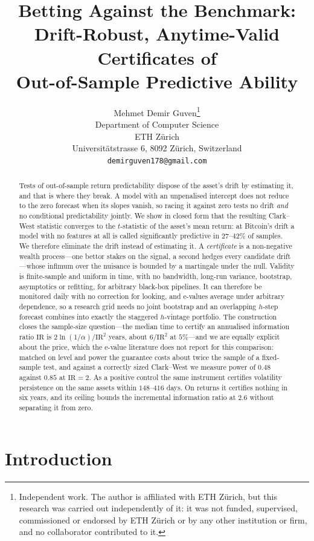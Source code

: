\documentclass{article}
\title{Betting Against the Benchmark:\\Drift-Robust, Anytime-Valid Certificates of\\Out-of-Sample Predictive Ability}
\author{%
  Mehmet Demir Guven\thanks{%
    Independent work. The author is affiliated with ETH Z\"urich, but this research was
    carried out independently of it: it was not funded, supervised, commissioned or endorsed
    by ETH Z\"urich or by any other institution or firm, and no collaborator contributed to
    it.} \\
  Department of Computer Science \\
  ETH Z\"urich \\
  Universit\"atstrasse 6, 8092 Z\"urich, Switzerland \\
  \texttt{demirguven178@gmail.com} \\
}
\theoremstyle{plain}
\theoremstyle{definition}
\begin{document}
\maketitle

\begin{abstract}
  Tests of out-of-sample return predictability dispose of the asset's drift by estimating it,
  and that is where they break. A model with an unpenalised intercept does not reduce to the
  zero forecast when its slopes vanish, so racing it against zero tests no drift \emph{and} no
  conditional predictability jointly. We show in closed form that the resulting Clark--West
  statistic converges to the $t$-statistic of the asset's mean return: at Bitcoin's drift a
  model with no features at all is called significantly predictive in $27$--$42\%$ of samples. We therefore eliminate the drift instead of estimating it. A \emph{certificate} is
  a non-negative wealth process---one bettor stakes on the signal, a second hedges every
  candidate drift---whose infimum over the nuisance is bounded by a martingale under the null. Validity is finite-sample and uniform in time, with no bandwidth, long-run
  variance, bootstrap, asymptotics or refitting, for arbitrary black-box pipelines. It can
  therefore be monitored daily with no correction for looking, and e-values average under
  arbitrary dependence, so a research grid needs no joint bootstrap and an overlapping
  $h$-step forecast combines into exactly the staggered $h$-vintage portfolio. The
  construction closes the sample-size question---the median time to certify an annualised
  information ratio $\mathrm{IR}$ is $2\ln(1/\alpha)/\mathrm{IR}^2$ years, about
  $6/\mathrm{IR}^2$ at $5\%$---and we are equally explicit about the price, which the e-value
  literature does not report for this comparison: matched on level and power the guarantee
  costs about twice the sample of a fixed-sample test, and against a correctly sized
  Clark--West we measure power of $0.48$ against $0.85$ at $\mathrm{IR}=2$. As a positive
  control the same instrument certifies volatility persistence on the same assets within
  $148$--$416$ days. On returns it certifies nothing in six years, and its ceiling bounds the
  incremental information ratio at $2.6$ without separating it from zero.
\end{abstract}

\section{Introduction}
\end{document}
